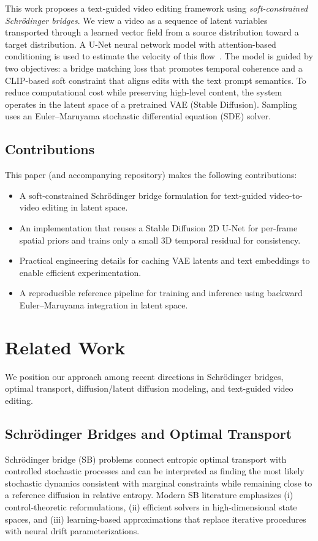 \documentclass[journal]{IEEEtran}
\begin{document}
This work proposes a text-guided video editing framework using \emph{soft-constrained Schr\"{o}dinger bridges}. We view a video as a sequence of latent variables transported through a learned vector field from a source distribution toward a target distribution. A U-Net neural network model with attention-based conditioning is used to estimate the velocity of this flow~\cite{ronneberger2015unet,vaswani2017attention}. The model is guided by two objectives: a bridge matching loss that promotes temporal coherence and a CLIP-based soft constraint that aligns edits with the text prompt semantics. To reduce computational cost while preserving high-level content, the system operates in the latent space of a pretrained VAE (Stable Diffusion). Sampling uses an Euler--Maruyama stochastic differential equation (SDE) solver.

\subsection{Contributions}
This paper (and accompanying repository) makes the following contributions:
\begin{itemize}
\item A soft-constrained Schr\"{o}dinger bridge formulation for text-guided video-to-video editing in latent space.
\item An implementation that reuses a Stable Diffusion 2D U-Net for per-frame spatial priors and trains only a small 3D temporal residual for consistency.
\item Practical engineering details for caching VAE latents and text embeddings to enable efficient experimentation.
\item A reproducible reference pipeline for training and inference using backward Euler--Maruyama integration in latent space.
\end{itemize}

\section{Related Work}
We position our approach among recent directions in Schr{\"{o}}dinger bridges, optimal transport, diffusion/latent diffusion modeling, and text-guided video editing.

\subsection{Schr\"{o}dinger Bridges and Optimal Transport}
Schr\"{o}dinger bridge (SB) problems connect entropic optimal transport with controlled stochastic processes and can be interpreted as finding the most likely stochastic dynamics consistent with marginal constraints while remaining close to a reference diffusion in relative entropy. Modern SB literature emphasizes (i) control-theoretic reformulations, (ii) efficient solvers in high-dimensional state spaces, and (iii) learning-based approximations that replace iterative procedures with neural drift parameterizations.
\end{document}
